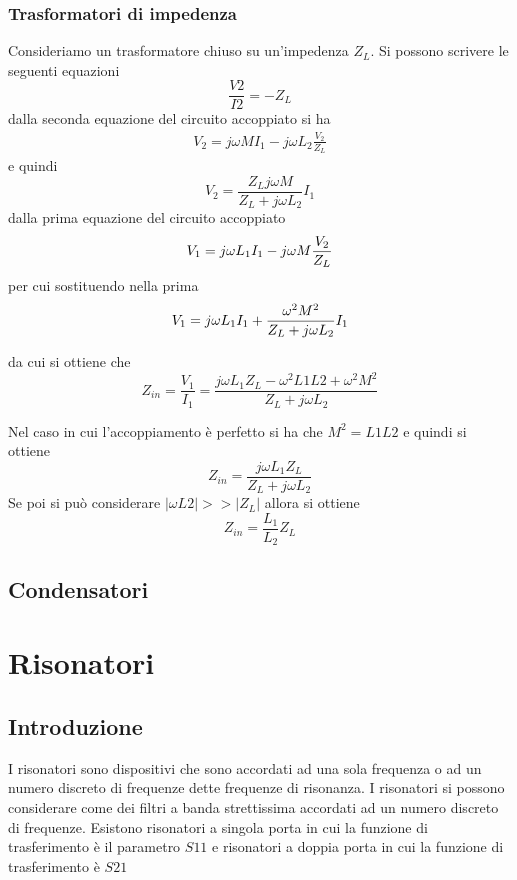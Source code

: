 \documentclass[10pt,a4paper]{book}
\begin{document}
\subsection{Trasformatori di impedenza}
Consideriamo un trasformatore chiuso su un'impedenza $Z_L$. Si possono scrivere le seguenti equazioni
\begin{equation}
\frac{V2}{I2}= -Z_L
\end{equation}
dalla seconda equazione del circuito accoppiato si ha
\begin{eqnarray}
V_2 = j \omega M   I_1 - j \omega L_2 \frac{V_2}{Z_L}
\end{eqnarray}
e quindi 
\begin{equation}
V_2  = \frac{Z_L j \omega M}{Z_L + j \omega L_2}I_1
\end{equation}
dalla prima equazione del circuito accoppiato
\begin{equation}
V_1 = j \omega L_1 I_1 -  j \omega M \frac{V_2}{Z_L} \\
\end{equation}
per cui sostituendo nella prima
\begin{equation}
V_1 = j \omega L_1 I_1   + \frac{ \omega^2 M ^2}{Z_L + j \omega L_2 }I_1 \\
\end{equation}

da cui si ottiene che 
\begin{equation}
Z_{in} = \frac{V_1}{I_1} = \frac{j \omega L_1  Z_L -\omega^2 L1 L2  +    \omega^2 M ^2}{Z_L + j \omega L_2} 
\end{equation}

Nel caso in cui l'accoppiamento è perfetto si ha che 
$M^2 = L1 L2 $
e quindi si ottiene 
\begin{equation}
Z_{in}  = \frac{j \omega L_1  Z_L}{Z_L + j \omega L_2}
\end{equation}
Se poi si può considerare $|\omega L2|>> |Z_L|$ allora si ottiene
\begin{equation}
Z_{in}  = \frac{L_1 }{L_2} Z_L
\end{equation}

\section{Condensatori}


\chapter{Risonatori}
\section{Introduzione}
I risonatori sono dispositivi che sono accordati ad una sola frequenza o ad un numero discreto di frequenze dette frequenze di risonanza. I risonatori si possono considerare come dei filtri a banda strettissima accordati ad un numero discreto di frequenze.
Esistono risonatori a singola porta in cui la funzione di trasferimento è il parametro $S11$ e risonatori a doppia porta in cui la funzione di trasferimento è $S21$
\end{document}
